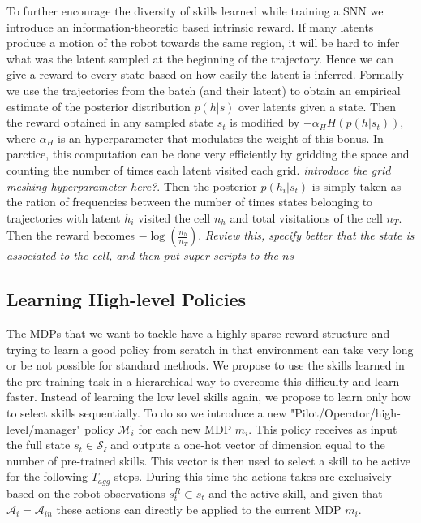 \documentclass{article} %
\begin{document}
To further encourage the diversity of skills learned while training a SNN we introduce an information-theoretic based intrinsic reward. If many latents produce a motion of the robot towards the same region, it will be hard to infer what was the latent sampled at the beginning of the trajectory. Hence we can give a reward to every state based on how easily the latent is inferred. Formally we use the trajectories from the batch (and their latent) to obtain an empirical estimate of the posterior distribution $p(h|s)$ over latents given a state. Then the reward obtained in any sampled state $s_t$ is modified by $-\alpha_H H(p(h|s_t))$, where $\alpha_H$ is an hyperparameter that modulates the weight of this bonus. In parctice, this computation can be done very efficiently by gridding the space and counting the number of times each latent visited each grid. \textit{introduce the grid meshing hyperparameter here?}. Then the posterior $p(h_i|s_t)$ is simply taken as the ration of frequencies between the number of times states belonging to trajectories with latent $h_i$ visited the cell $n_h$ and total visitations of the cell $n_T$. Then the reward becomes $-\log(\frac{n_h}{n_T})$. \textit{Review this, specify better that the state is associated to the cell, and then put super-scripts to the $n$s}

\subsection{Learning High-level Policies}
\label{section:method:highlevel}

The MDPs that we want to tackle have a highly sparse reward structure and trying to learn a good policy from scratch in that environment can take very long or be not possible for standard methods. We propose to use the skills learned in the pre-training task in a hierarchical way to overcome this difficulty and learn faster. Instead of learning the low level skills again, we propose to learn only how to select skills sequentially. To do so we introduce a new "Pilot/Operator/high-level/manager" policy $\mathcal{M}_i$ for each new MDP $m_i$. This policy receives as input the full state $s_t\in \mathcal{S_i}$ and outputs a one-hot vector of dimension equal to the number of pre-trained skills. This vector is then used to select a skill to be active for the following $T_{agg}$ steps. During this time the actions takes are exclusively based on the robot observations $s^R_t\subset s_t$ and the active skill, and given that $\mathcal{A}_i = \mathcal{A}_{in}$ these actions can directly be applied to the current MDP $m_i$.
\end{document}
